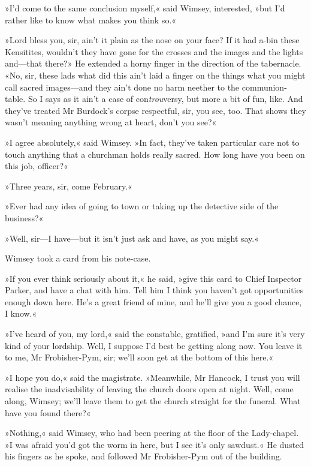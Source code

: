 »I'd come to the same conclusion myself,« said Wimsey, interested, »but I'd rather like to know what makes you think so.«

»Lord bless you, sir, ain't it plain as the nose on your face? If it had a-bin these Kensitites, wouldn't they have gone for the crosses and the images and the lights and—that there?» He extended a horny finger in the direction of the tabernacle. «No, sir, these lads what did this ain't laid a finger on the things what you might call sacred images—and they ain't done no harm neether to the communion-table. So I says as it ain't a case of con\textit{trou}versy, but more a bit of fun, like. And they've treated Mr Burdock's corpse respectful, sir, you see, too. That shows they wasn't meaning anything wrong at heart, don't you see?«

»I agree absolutely,« said Wimsey. »In fact, they've taken particular care not to touch anything that a churchman holds really sacred. How long have you been on this job, officer?«

»Three years, sir, come February.«

»Ever had any idea of going to town or taking up the detective side of the business?«

»Well, sir—I have—but it isn't just ask and have, as you might say.«

Wimsey took a card from his note-case.

»If you ever think seriously about it,« he said, »give this card to Chief Inspector Parker, and have a chat with him. Tell him I think you haven't got opportunities enough down here. He's a great friend of mine, and he'll give you a good chance, I know.«

»I've heard of you, my lord,« said the constable, gratified, »and I'm sure it's very kind of your lordship. Well, I suppose I'd best be getting along now. You leave it to me, Mr Frobisher-Pym, sir; we'll soon get at the bottom of this here.«

»I hope you do,« said the magistrate. »Meanwhile, Mr Hancock, I trust you will realise the inadvisability of leaving the church doors open at night. Well, come along, Wimsey; we'll leave them to get the church straight for the funeral. What have you found there?«

»Nothing,« said Wimsey, who had been peering at the floor of the Lady-chapel. »I was afraid you'd got the worm in here, but I see it's only sawdust.« He dusted his fingers as he spoke, and followed Mr Frobisher-Pym out of the building.

